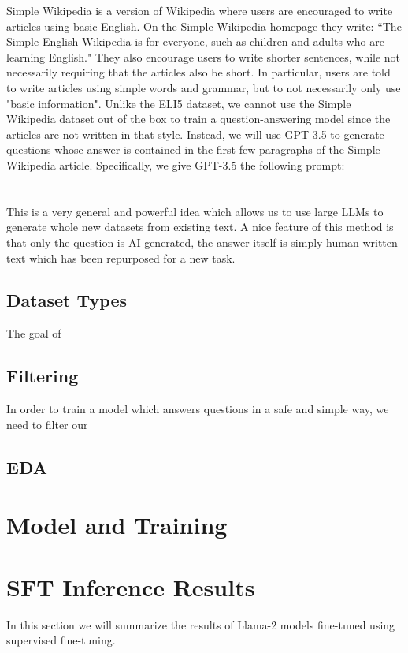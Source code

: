 \documentclass[11pt, oneside]{article}   	%
\begin{document}
Simple Wikipedia is a version of Wikipedia where users are encouraged to write articles using basic English.
On the Simple Wikipedia homepage they write: ``The Simple English Wikipedia is for everyone, such as children and adults who are learning English."
They also encourage users to write shorter sentences, while not necessarily requiring that the articles also be short.
In particular, users are told to write articles using simple words and grammar, but to not necessarily only use "basic information".
Unlike the ELI5 dataset, we cannot use the Simple Wikipedia dataset out of the box to train a question-answering model since the articles are not written in that style.
Instead, we will use GPT-3.5 to generate questions whose answer is contained in the first few paragraphs of the Simple Wikipedia article. 
Specifically, we give GPT-3.5 the following prompt:
\\[5pt]

\\
\\
This is a very general and powerful idea which allows us to use large LLMs to generate whole new datasets from existing text.
A nice feature of this method is that only the question is AI-generated, the answer itself is simply human-written text which has been repurposed for a new task.

\subsection{Dataset Types}
The goal of 


\subsection{Filtering}
In order to train a model which answers questions in a safe and simple way, we need to filter our


\subsection{EDA}
\section{Model and Training}
\section{SFT Inference Results}
In this section we will summarize the results of Llama-2 models fine-tuned using supervised fine-tuning.
\end{document}
